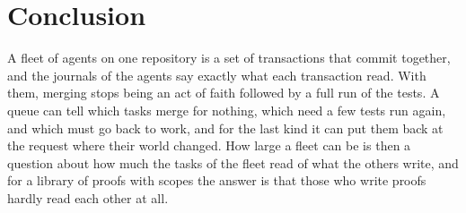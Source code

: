 \documentclass[acmsmall,nonacm,screen]{acmart}
\begin{document}
\section{Conclusion}

A fleet of agents on one repository is a set of transactions that commit together, and the
journals of the agents say exactly what each transaction read. With them, merging stops
being an act of faith followed by a full run of the tests. A queue can tell which tasks
merge for nothing, which need a few tests run again, and which must go back to work, and for
the last kind it can put them back at the request where their world changed. How large a
fleet can be is then a question about how much the tasks of the fleet read of what the
others write, and for a library of proofs with scopes the answer is that those who write
proofs hardly read each other at all.



\end{document}
